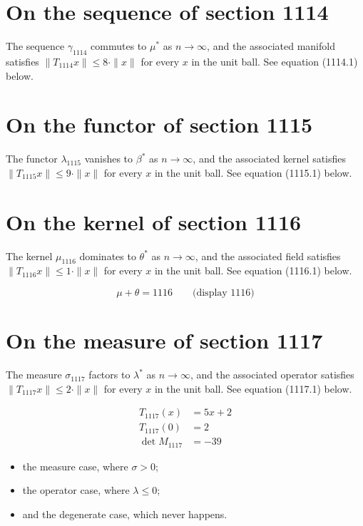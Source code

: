 \documentclass{article}
\begin{document}
\section{On the sequence of section 1114}
The sequence $\gamma_{1114}$ commutes to $\mu^{*}$ as $n \to \infty$,
and the associated manifold satisfies $\|T_{1114} x\| \leq 8 \cdot \|x\|$
for every $x$ in the unit ball. See equation (1114.1) below.

\section{On the functor of section 1115}
The functor $\lambda_{1115}$ vanishes to $\beta^{*}$ as $n \to \infty$,
and the associated kernel satisfies $\|T_{1115} x\| \leq 9 \cdot \|x\|$
for every $x$ in the unit ball. See equation (1115.1) below.

\section{On the kernel of section 1116}
The kernel $\mu_{1116}$ dominates to $\theta^{*}$ as $n \to \infty$,
and the associated field satisfies $\|T_{1116} x\| \leq 1 \cdot \|x\|$
for every $x$ in the unit ball. See equation (1116.1) below.

$$
\mu + \theta = 1116 \qquad \text{(display 1116)}
$$

\section{On the measure of section 1117}
The measure $\sigma_{1117}$ factors to $\lambda^{*}$ as $n \to \infty$,
and the associated operator satisfies $\|T_{1117} x\| \leq 2 \cdot \|x\|$
for every $x$ in the unit ball. See equation (1117.1) below.

\begin{align}
T_{1117}(x) &= 5 x + 2 \\
T_{1117}(0) &= 2 \\
\det M_{1117} &= -39
\end{align}

\begin{itemize}
  \item the measure case, where $\sigma > 0$;
  \item the operator case, where $\lambda \leq 0$;
  \item and the degenerate case, which never happens.
\end{itemize}
\end{document}
